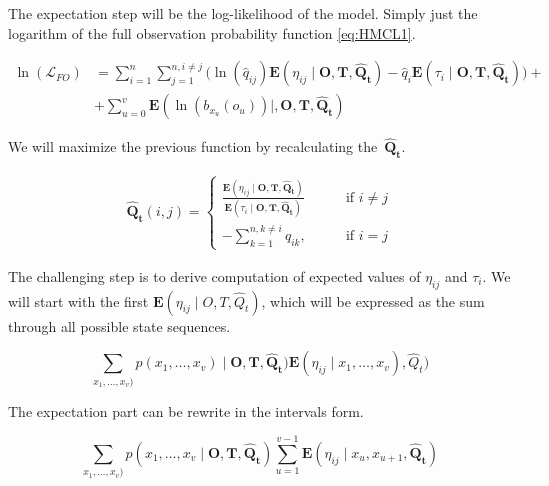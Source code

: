 \documentclass[thesis=M,english]{FITthesis}[2012/10/20]
\newcommand{\matr}[1]{\mathbf{#1}}
\begin{document}
The expectation step will be the log-likelihood of the model. Simply just the logarithm of the full observation probability function \eqref{eq:HMCL1}.

\begin{equation}\label{eq:EMCTHMM}
\begin{aligned}  
 \ln(\mathcal{L}_{FO}) &= \sum_{i=1}^{n} \sum_{j=1}^{n, i \neq j} \big( \ln( \hat q_{ij}) \mathbf{E}( \eta_{ij} \mid \matr{O},\matr{T}, \matr{ \hat Q_t } ) - \hat q_i \mathbf{E}( \tau_i \mid \matr{O},\matr{T}, \matr{ \hat Q_t } ) \big) + \\
    &+ \sum_{u=0}^v \mathbf{E}( \ln( b_{ x_u }(o_u) ) \mid, \matr{O},\matr{T},\matr{\hat Q_t} )
\end{aligned}
\end{equation}

We will maximize the previous function by recalculating the~$\matr{ \hat Q_t }$. 

\begin{equation}\label{eq:Qmax}
\begin{aligned}  
\matr{ \hat Q_t }(i,j)= 
\begin{cases}
\frac{ \mathbf{E}(\eta_{ij} \mid \matr{O},\matr{T}, \matr{ \hat Q_t } )}{ \mathbf{E}( \tau_i \mid \matr{O},\matr{T}, \matr{\hat Q_t} ) } & \text{if } i\neq j\\
- \sum\limits_{k=1}^{n,k \neq i} q_{ik}, \qquad & \text{if } i=j
\end{cases}
\end{aligned}
\end{equation}


The challenging step is to derive computation of expected values of $\eta_{ij}$ and $\tau_i$. We will start with the first $\mathbf{E}(\eta_{ij} \mid O,T, \hat Q_t )$, which will be expressed as the sum through all possible state sequences.

\begin{equation} 
\sum_{x_1,\dots,x_v)} p(x_1,\dots,x_v) \mid \matr{O},\matr{T}, \matr{ \hat Q_t }) \mathbf{E}(\eta_{ij} \mid x_1,\dots,x_v) ,\hat Q_t )
\end{equation}

The expectation part can be rewrite in the intervals form.  

\begin{equation}
 \sum_{x_1,\dots,x_v)} p(x_1,\dots,x_v \mid \matr{O},\matr{T}, \matr{ \hat Q_t }) \sum_{u=1}^{v-1}\mathbf{E}(\eta_{ij} \mid x_u, x_{u+1} ,\matr{\hat Q_t} )
\end{equation}
\end{document}
